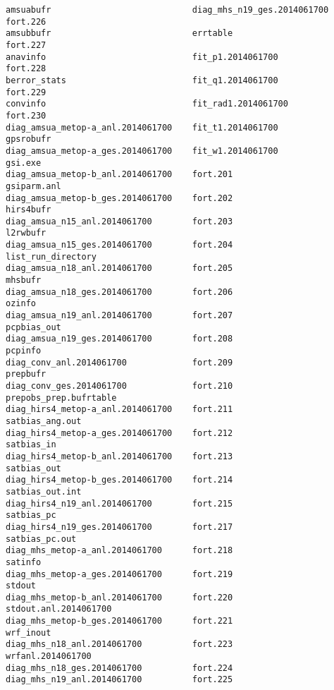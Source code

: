 \begin{scriptsize}
\begin{verbatim}
amsuabufr                            diag_mhs_n19_ges.2014061700   fort.226
amsubbufr                            errtable                      fort.227
anavinfo                             fit_p1.2014061700             fort.228
berror_stats                         fit_q1.2014061700             fort.229
convinfo                             fit_rad1.2014061700           fort.230
diag_amsua_metop-a_anl.2014061700    fit_t1.2014061700             gpsrobufr
diag_amsua_metop-a_ges.2014061700    fit_w1.2014061700             gsi.exe
diag_amsua_metop-b_anl.2014061700    fort.201                      gsiparm.anl
diag_amsua_metop-b_ges.2014061700    fort.202                      hirs4bufr
diag_amsua_n15_anl.2014061700        fort.203                      l2rwbufr
diag_amsua_n15_ges.2014061700        fort.204                      list_run_directory
diag_amsua_n18_anl.2014061700        fort.205                      mhsbufr
diag_amsua_n18_ges.2014061700        fort.206                      ozinfo
diag_amsua_n19_anl.2014061700        fort.207                      pcpbias_out
diag_amsua_n19_ges.2014061700        fort.208                      pcpinfo
diag_conv_anl.2014061700             fort.209                      prepbufr
diag_conv_ges.2014061700             fort.210                      prepobs_prep.bufrtable
diag_hirs4_metop-a_anl.2014061700    fort.211                      satbias_ang.out
diag_hirs4_metop-a_ges.2014061700    fort.212                      satbias_in
diag_hirs4_metop-b_anl.2014061700    fort.213                      satbias_out
diag_hirs4_metop-b_ges.2014061700    fort.214                      satbias_out.int
diag_hirs4_n19_anl.2014061700        fort.215                      satbias_pc
diag_hirs4_n19_ges.2014061700        fort.217                      satbias_pc.out
diag_mhs_metop-a_anl.2014061700      fort.218                      satinfo
diag_mhs_metop-a_ges.2014061700      fort.219                      stdout
diag_mhs_metop-b_anl.2014061700      fort.220                      stdout.anl.2014061700
diag_mhs_metop-b_ges.2014061700      fort.221                      wrf_inout
diag_mhs_n18_anl.2014061700          fort.223                      wrfanl.2014061700
diag_mhs_n18_ges.2014061700          fort.224
diag_mhs_n19_anl.2014061700          fort.225
\end{verbatim}
\end{scriptsize}

